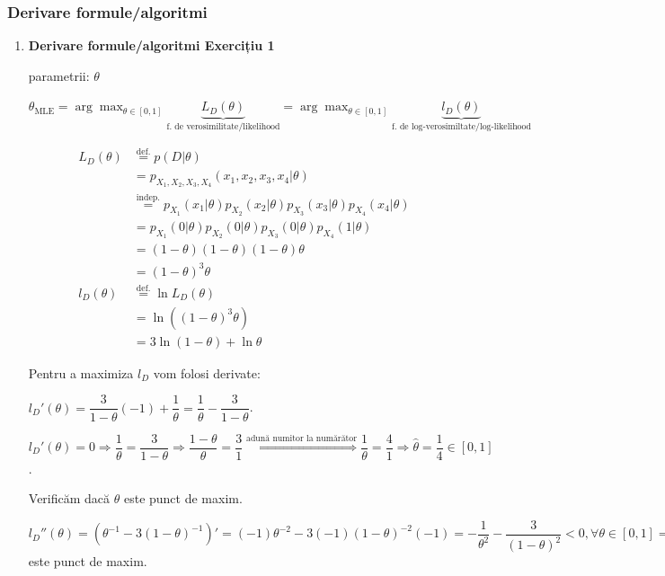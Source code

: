 \documentclass[12pt]{article}
\begin{document}
\newpage

	\subsubsection{Derivare formule/algoritmi}
	\begin{enumerate}
		\item \textbf{Derivare formule/algoritmi Exercițiu 1}
		
		parametrii: $\theta$
		
		$\theta_\text{MLE} = \arg \max_{\theta \in [0,1]} \underbrace{L_D(\theta)}_\text{f. de verosimilitate/likelihood} = \arg \max_{\theta \in [0,1]} \underbrace{l_D(\theta)}_\text{f. de log-verosimiltate/log-likelihood}$
		
		\begin{align*}
		L_D(\theta) &\stackrel{\text{def.}}{=} p(D|\theta)\\
		&=p_{X_1,X_2,X_3,X_4}(x_1,x_2,x_3,x_4|\theta)\\
		&\stackrel{\text{indep.}}{=}p_{X_1}(x_1|\theta) p_{X_2}(x_2|\theta) p_{X_3}(x_3|\theta) p_{X_4}(x_4|\theta)\\
		&=p_{X_1}(0|\theta) p_{X_2}(0|\theta) p_{X_3}(0|\theta) p_{X_4}(1|\theta)\\
		&=(1-\theta)(1-\theta)(1-\theta)\theta\\
		&=(1-\theta)^3 \theta\\
		l_D(\theta) &\stackrel{\text{def.}}{=} \ln L_D(\theta)\\
		&=\ln \left((1-\theta)^3 \theta\right)\\
		&=3 \ln(1-\theta) + \ln \theta
		\end{align*}
		
		Pentru a maximiza $l_D$ vom folosi derivate:
		
		$l_D'(\theta) = \dfrac{3}{1-\theta}(-1) + \dfrac{1}{\theta} = \dfrac{1}{\theta} - \dfrac{3}{1-\theta}$.
		
		$l_D'(\theta) = 0 \Rightarrow \dfrac{1}{\theta} = \dfrac{3}{1-\theta} \Rightarrow \dfrac{1-\theta}{\theta} = \dfrac{3}{1} \stackrel{\text{adună numitor la numărător}}{\Rightarrow} \dfrac{1}{\theta} = \dfrac{4}{1} \Rightarrow \hat{\theta} = \dfrac{1}{4} \in [0,1]$.
		
		Verificăm dacă $\hat{\theta}$ este punct de maxim.
		
		$l_D''(\theta) = (\theta^{-1} - 3(1-\theta)^{-1})' = (-1)\theta^{-2} - 3(-1)(1-\theta)^{-2}(-1) = -\dfrac{1}{\theta^2} - \dfrac{3}{(1-\theta)^2} < 0, \forall \theta \in [0,1] \Rightarrow l_D\text{-concavă} \Rightarrow \hat{\theta} = \dfrac{1}{4}$ este punct de maxim.
		

\end{enumerate}
\end{document}
